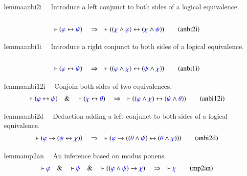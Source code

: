 \begin{restatable}{lemma}{anbi2i}~~ Introduce a left conjunct to both sides of a
logical equivalence.
       ~  ~
\begin{align}
\vdash ( \mw{\varphi} \leftrightarrow \mw{\psi} )\quad\Rightarrow\quad \vdash (
    ( \mw{\chi} \wedge \mw{\varphi} ) \leftrightarrow ( \mw{\chi} \wedge
    \mw{\psi} ) )\label{eq:anbi2i}\tag{anbi2i}
\end{align}
\end{restatable}

\begin{restatable}{lemma}{anbi1i}~~ Introduce a right conjunct to both sides of
a logical equivalence.
       ~  ~
\begin{align}
\vdash ( \mw{\varphi} \leftrightarrow \mw{\psi} )\quad\Rightarrow\quad \vdash (
    ( \mw{\varphi} \wedge \mw{\chi} ) \leftrightarrow ( \mw{\psi} \wedge
    \mw{\chi} ) )\label{eq:anbi1i}\tag{anbi1i}
\end{align}
\end{restatable}

\begin{restatable}{lemma}{anbi12i}~~ Conjoin both sides of two equivalences. 
~
\begin{align}
\vdash ( \mw{\varphi} \leftrightarrow \mw{\psi} )\quad\&\quad \vdash (
    \mw{\chi} \leftrightarrow \mw{\theta} )\quad\Rightarrow\quad \vdash ( (
    \mw{\varphi} \wedge \mw{\chi} ) \leftrightarrow ( \mw{\psi} \wedge
    \mw{\theta} ) )\label{eq:anbi12i}\tag{anbi12i}
\end{align}
\end{restatable}

\begin{restatable}{lemma}{anbi2d}~~ Deduction adding a left conjunct to both
sides of a logical equivalence.
       ~  ~
\begin{align}
\vdash ( \mw{\varphi} \rightarrow ( \mw{\psi} \leftrightarrow \mw{\chi} )
    )\quad\Rightarrow\quad \vdash ( \mw{\varphi} \rightarrow ( ( \mw{\theta}
    \wedge \mw{\psi} ) \leftrightarrow ( \mw{\theta} \wedge \mw{\chi} ) )
    )\label{eq:anbi2d}\tag{anbi2d}
\end{align}
\end{restatable}

\begin{restatable}{lemma}{mp2an}~~ An inference based on modus ponens. 
~
\begin{align}
\vdash \mw{\varphi}\quad\&\quad \vdash \mw{\psi}\quad\&\quad \vdash ( (
    \mw{\varphi} \wedge \mw{\psi} ) \rightarrow \mw{\chi}
    )\quad\Rightarrow\quad \vdash \mw{\chi}\label{eq:mp2an}\tag{mp2an}
\end{align}
\end{restatable}

